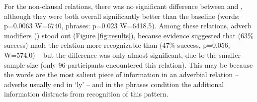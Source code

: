 For the non-clausal relations, there was no significant difference between  and , although they were both overall significantly better than the baseline (words: p=0.0063 W=6740, phrases: p=0.023 W=6418.5). Among these relations, adverb modifiers () stood out (Figure \ref{fig:results}), because evidence suggested that  (63\% success) made the relation more recognizable than  (47\% success, p=0.056, W=574.0) -- but the difference was only almost significant, due to the smaller sample size (only 96 participants encountered this relation). This may be because the words are the most salient piece of information in an adverbial relation -- adverbs usually end in `ly' -- and in the phrases condition the additional information distracts from recognition of this pattern.


